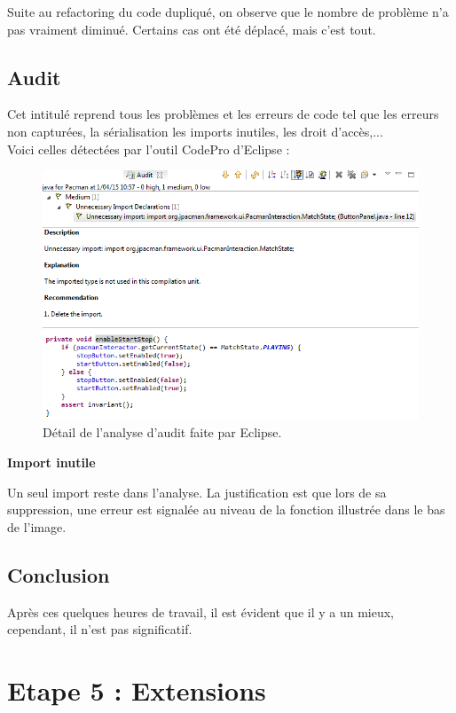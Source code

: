 \documentclass[12pt,a4paper,final]{article}
\newcommand{\smalltitle}[1]{\bigskip\large\textbf{#1}\par\normalsize\medskip}
\begin{document}
Suite au refactoring du code dupliqué, on observe que le nombre de problème n'a pas vraiment diminué. Certains cas ont été déplacé, mais c'est tout.

\clearpage
\subsection{Audit}
Cet intitulé reprend tous les problèmes et les erreurs de code tel que les erreurs non capturées, la sérialisation les imports inutiles, les droit d'accès,...\\
Voici celles détectées par l'outil CodePro d'Eclipse : 
\begin{figure}[!h]
	\centering
	\includegraphics[width=\textwidth]{Audit_refactor.png}
	\caption{\label{Audit_refact}Détail de l'analyse d'audit faite par Eclipse.}
\end{figure}

\smalltitle{Import inutile}
Un seul import reste dans l'analyse. La justification est que lors de sa suppression, une erreur est signalée au niveau de la fonction illustrée dans le bas de l'image.

\subsection{Conclusion}
Après ces quelques heures de travail, il est évident que il y a un mieux, cependant, il n'est pas significatif.


\newpage
\section{Etape 5 : Extensions}\label{sec:etape5}
\end{document}
